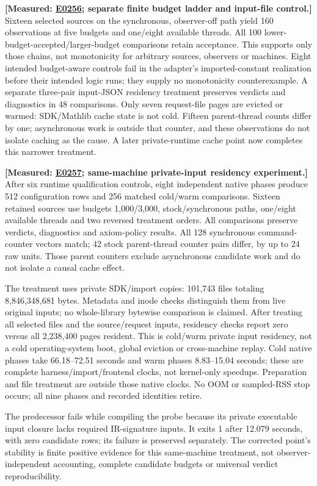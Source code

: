 \documentclass[10pt,twocolumn]{article}
\newcommand{\measured}[1]{\textbf{[Measured: #1]}}
\newcommand{\expref}[2]{\href{https://github.com/yunwei37/proofserve/blob/main/docs/tmp/build-and-evaluate/step-#1/step-report.md}{E#2}}
\begin{document}
\measured{\expref{0256-20261101T205729+0000}{0256}; separate finite budget ladder and input-file control.}
Sixteen selected sources on the synchronous, observer-off path yield
160 observations at five budgets and one/eight available threads.
All 100 lower-budget-accepted/larger-budget comparisons retain acceptance.
This supports only those chains, not monotonicity for arbitrary sources,
observers or machines. Eight intended budget-aware controls fail in the
adapter's imported-constant realization before their intended logic runs;
they supply no monotonicity counterexample.
A separate three-pair input-JSON residency treatment preserves verdicts
and diagnostics in 48 comparisons. Only seven request-file pages are
evicted or warmed: SDK/Mathlib cache state is not cold.
Fifteen parent-thread counts differ by one; asynchronous work is outside
that counter, and these observations do not isolate caching as the cause.
A later private-runtime cache point now completes this narrower treatment.

\measured{\expref{0257-20261101T215746+0000}{0257}; same-machine private-input residency experiment.}
After six runtime qualification controls, eight independent native phases
produce 512 configuration rows and 256 matched cold/warm comparisons.
Sixteen retained sources use budgets 1,000/3,000, stock/synchronous paths,
one/eight available threads and two reversed treatment orders.
All comparisons preserve verdicts, diagnostics and axiom-policy results.
All 128 synchronous command-counter vectors match; 42 stock parent-thread
counter pairs differ, by up to 24 raw units. Those parent counters exclude
asynchronous candidate work and do not isolate a causal cache effect.

The treatment uses private SDK/import copies: 101,743 files totaling
8,846,348,681 bytes. Metadata and inode checks distinguish them from live
original inputs; no whole-library bytewise comparison is claimed.
After treating all selected files and the source/request inputs,
residency checks report zero versus all 2,238,400 pages resident.
This is cold/warm private input residency, not a cold operating-system boot,
global eviction or cross-machine replay.
Cold native phases take 66.18--72.51 seconds and warm phases 8.83--15.04
seconds; these are complete harness/import/frontend clocks, not kernel-only
speedups. Preparation and file treatment are outside those native clocks.
No OOM or sampled-RSS stop occurs; all nine phases and recorded identities retire.

The predecessor fails while compiling the probe because its private executable
input closure lacks required IR-signature inputs. It exits 1 after 12.079
seconds, with zero candidate rows; its failure is preserved separately.
The corrected point's stability is finite positive evidence for this
same-machine treatment, not observer-independent accounting, complete
candidate budgets or universal verdict reproducibility.
\end{document}
